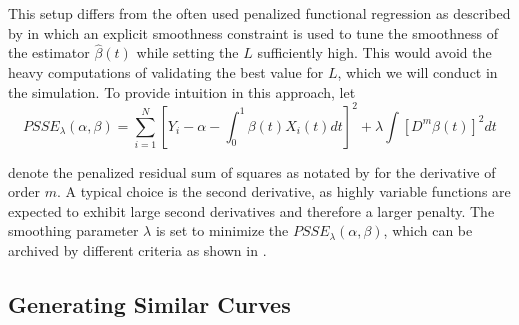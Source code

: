 \documentclass[11pt,twoside,a4paper]{article}
\begin{document}
	This setup differs from the often used penalized functional regression as described by \cite{Goldsmith_2011} in which an explicit smoothness constraint is used to tune the smoothness of the estimator $\hat{\beta}(t)$ while setting the $L$ sufficiently high. This would avoid the heavy computations of validating the best value for $L$, which we will conduct in the simulation. To provide intuition in this approach, let 
	 \begin{equation}
	 	PSSE_\lambda(\alpha, \beta) = \sum_{i = 1}^{N} \left[ Y_i -\alpha -\int_0^1 \beta(t)X_i(t)dt \right]^2 + \lambda \int \left[D^m\beta(t)\right]^2 dt
	 \end{equation}
 
	 denote the penalized residual sum of squares as notated by \cite{ramsay_functional_2005} for the derivative of order $m$. A typical choice is the second derivative, as highly variable functions are expected to exhibit large second derivatives and therefore a larger penalty. The smoothing parameter $\lambda$ is set to minimize the $PSSE_\lambda(\alpha, \beta)$, which can be archived by different criteria as shown in \cite{ThomasLee_2003}.
		
		
	
	\subsection{Generating Similar Curves}\label{similar_curves}
	
\end{document}
